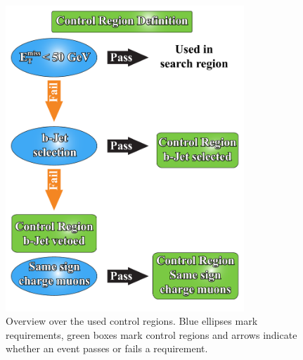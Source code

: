 \begin{figure}[!h]
  \centering
  \includegraphics[width=0.8\textwidth]{plots/cr-overview.pdf}
  \caption{Overview over the used control regions. Blue ellipses mark requirements, green boxes mark control regions and arrows indicate whether an event passes or fails a requirement.}
  \label{fig:cr-overview}
\end{figure}


